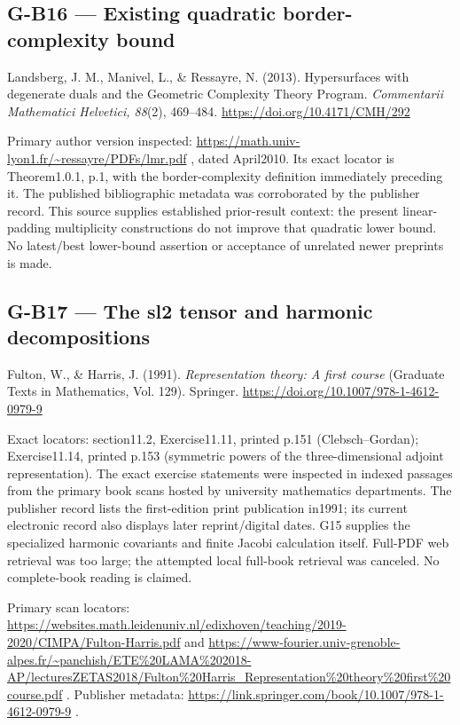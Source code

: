 \documentclass[11pt,a4paper]{article}
\theoremstyle{definition}\newtheorem{definition}{Definition}
\begin{document}
\subsection{G-B16 --- Existing quadratic border-complexity
bound}\label{g-b16--existing-quadratic-border-complexity-bound}

Landsberg, J. M., Manivel, L., \& Ressayre, N. (2013). Hypersurfaces
with degenerate duals and the Geometric Complexity Theory Program.
\emph{Commentarii Mathematici Helvetici, 88}(2), 469--484.
\url{https://doi.org/10.4171/CMH/292}

Primary author version inspected:
\url{https://math.univ-lyon1.fr/~ressayre/PDFs/lmr.pdf} , dated
April2010. Its exact locator is Theorem1.0.1, p.1, with the
border-complexity definition immediately preceding it. The published
bibliographic metadata was corroborated by the publisher record. This
source supplies established prior-result context: the present
linear-padding multiplicity constructions do not improve that quadratic
lower bound. No latest/best lower-bound assertion or acceptance of
unrelated newer preprints is made.

\subsection{G-B17 --- The sl2 tensor and harmonic
decompositions}\label{g-b17--the-sl2-tensor-and-harmonic-decompositions}

Fulton, W., \& Harris, J. (1991). \emph{Representation theory: A first
course} (Graduate Texts in Mathematics, Vol. 129). Springer.
\url{https://doi.org/10.1007/978-1-4612-0979-9}

Exact locators: section11.2, Exercise11.11, printed p.151
(Clebsch--Gordan); Exercise11.14, printed p.153 (symmetric powers of the
three-dimensional adjoint representation). The exact exercise statements
were inspected in indexed passages from the primary book scans hosted by
university mathematics departments. The publisher record lists the
first-edition print publication in1991; its current electronic record
also displays later reprint/digital dates. G15 supplies the specialized
harmonic covariants and finite Jacobi calculation itself. Full-PDF web
retrieval was too large; the attempted local full-book retrieval was
canceled. No complete-book reading is claimed.

Primary scan locators:
\url{https://websites.math.leidenuniv.nl/edixhoven/teaching/2019-2020/CIMPA/Fulton-Harris.pdf}
and
\url{https://www-fourier.univ-grenoble-alpes.fr/~panchish/ETE\%20LAMA\%202018-AP/lecturesZETAS2018/Fulton\%20Harris_Representation\%20theory\%20first\%20course.pdf}
. Publisher metadata:
\url{https://link.springer.com/book/10.1007/978-1-4612-0979-9} .
\end{document}
